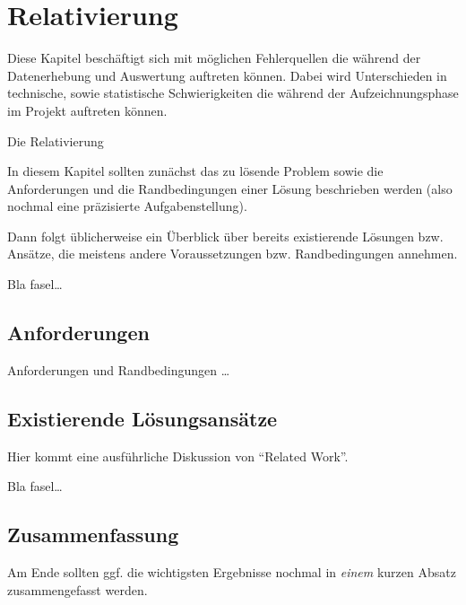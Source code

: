 
\chapter{Relativierung}
\label{ch:Relativierung}

Diese Kapitel beschäftigt sich mit möglichen Fehlerquellen die während der Datenerhebung und Auswertung auftreten können. 
Dabei wird Unterschieden in technische, sowie statistische Schwierigkeiten die während der Aufzeichnungsphase im Projekt auftreten können.




Die Relativierung 

In diesem Kapitel sollten zunächst das zu lösende Problem
sowie die Anforderungen und die Randbedingungen 
einer Lösung beschrieben werden (also nochmal
eine präzisierte Aufgabenstellung).

Dann folgt üblicherweise ein Überblick über bereits existierende
Lösungen bzw. Ansätze, die meistens andere Voraussetzungen bzw.
Randbedingungen annehmen.

Bla fasel\ldots

\section{Anforderungen}
\label{ch:Relativierung:sec:Anforderungen}
Anforderungen und Randbedingungen \ldots

\section{Existierende Lösungsansätze}
\label{ch:Relativierung:sec:RelatedWork}

Hier kommt eine ausführliche Diskussion
von "`Related Work"'.

Bla fasel\ldots


\section{Zusammenfassung}
\label{ch:Relativierung:sec:zusammenfassung}

Am Ende sollten ggf. die wichtigsten Ergebnisse nochmal in \emph{einem}
kurzen Absatz zusammengefasst werden.


